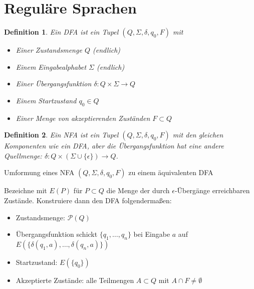 \documentclass{cheat-sheet}
\newtheorem*{definition}{Definition}
\begin{document}


\section{Reguläre Sprachen}

\begin{definition}
Ein \emph{DFA} ist ein Tupel $(Q, \Sigma, \delta, q_{0}, F)$ mit

\begin{itemize}{\leftmargin=0em}
  \setlength{\leftmargin}{0pt}
  \item Einer \emph{Zustandsmenge} $Q$ (endlich)
  \item Einem \emph{Eingabealphabet} $\Sigma$ (endlich)
  \item Einer \emph{Übergangsfunktion} $\delta : Q \times \Sigma \to Q$
  \item Einem \emph{Startzustand} $q_{0} \in Q$
  \item Einer Menge von \emph{akzeptierenden Zuständen} $F \subset Q$
\end{itemize}
\end{definition}

\begin{definition}
Ein \emph{NFA} ist ein Tupel $(Q, \Sigma, \delta, q_{0}, F)$ mit den gleichen Komponenten wie ein DFA, aber die Übergangsfunktion hat eine andere Quellmenge: $\delta : Q \times (\Sigma \cup \{ \epsilon \}) \to Q$.
\end{definition}

\begin{alg}
Umformung eines NFA $(Q, \Sigma, \delta, q_{0}, F)$ zu einem äquivalenten DFA
\end{alg}

Bezeichne mit $E(P)$ für $P \subset Q$ die Menge der durch $\epsilon$-Übergänge erreichbaren Zustände. Konstruiere dann den DFA folgendermaßen:

\begin{itemize}
  \item Zustandsmenge: $\mathcal{P}(Q)$
  \item Übergangsfunktion schickt $\{q_{1}, \ldots, q_{n}\}$ bei Eingabe $a$ auf $E(\{\delta(q_{1}, a), \ldots, \delta(q_{n}, a)\})$
  \item Startzustand: $E(\{q_{0}\})$
  \item Akzeptierte Zustände: alle Teilmengen $A \subset Q$ mit $A \cap F \neq \emptyset$
\end{itemize}
\end{document}
